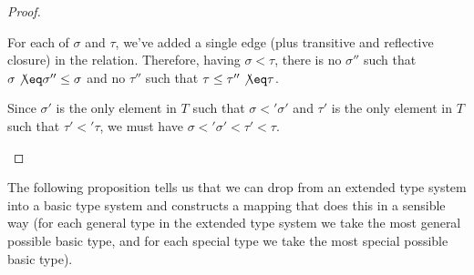 \documentclass[main.tex]{subfiles}
\begin{document}
\begin{proof}
\begin{itemize}
\begin{itemize}
                    For each of $\sigma$ and $\tau$, we've added a single edge
                    (plus transitive and reflective closure) in the relation.
                    Therefore, having $\sigma \less \tau$, there is no
                    $\sigma''$ such that $\sigma \not\eq \sigma'' \less \sigma$
                    and no $\tau''$ such that $\tau \less \tau'' \not\eq \tau$.

                    Since $\sigma'$ is the only element in $T$ such that
                    $\sigma \less' \sigma'$  and $\tau'$ is the only element in $T$
                    such that $\tau' \less' \tau$, we must have
                    $\sigma \less' \sigma' \less \tau' \less \tau$.
            \end{itemize}
    \end{itemize}
\end{proof}

The following proposition tells us that we can drop from an extended type
system into a basic type system and constructs a mapping that does this in a
sensible way (for each general type in the extended type system we take the
most general possible basic type, and for each special type we take the most
special possible basic type).
\end{document}
